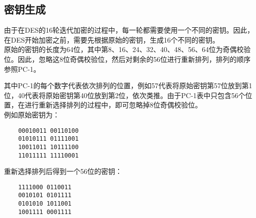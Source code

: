 \subsection{密钥生成}

由于在DES的16轮迭代加密的过程中，每一轮都需要使用一个不同的密钥。因此，在DES开始加密之前，需要先根据原始的密钥，生成16个不同的密钥。\\

原始的密钥的长度为64位，其中第8、16、24、32、40、48、56、64位为奇偶校验位。因此，忽略这8位奇偶校验位，然后对剩余的56位进行重新排列，排列的顺序参照PC-1。\\

\begin{table}[H]
    \centering
    \caption{PC-1}
\end{table}

其中PC-1的每个数字代表依次排列的位置，例如57代表将原始密钥第57位放到第1位，40代表将原始密钥第40位放到第2位，依次类推。由于PC-1表中只包含56个位置，在进行重新选择排列的过程中，即可忽略掉8位奇偶校验位。\\

例如原始密钥为：

\begin{verbatim}
    00010011 00110100
    01010111 01111001
    10011011 10111100
    11011111 11110001
\end{verbatim}

重新选择排列后得到一个56位的密钥：

\begin{verbatim}
    1111000 0110011
    0010101 0101111
    0101010 1011001
    1001111 0001111
\end{verbatim}

